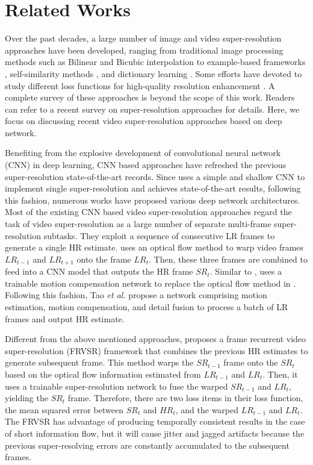 \documentclass[letterpaper]{article} %
\begin{document}
\section{Related Works}

Over the past decades, a large number of image and video super-resolution approaches have been developed, ranging from traditional image processing methods such as Bilinear and Bicubic interpolation to example-based frameworks \cite{Timofte2014Anchored,Jeong2015Multi,Xiong2013Example,Freedman2011TOG}, self-similarity methods \cite{Huang2015Single,Yang2010Exploiting}, and dictionary learning \cite{Perezpellitero2016PSyCo}. Some efforts have devoted to study different loss functions for high-quality resolution enhancement \cite{Sajjadi2017ICCV}. A complete survey of these approaches is beyond the scope of this work. Readers can refer to a recent survey \cite{Walha2016,Agustsson2017cvpr} on super-resolution approaches for details. Here, we focus on discussing recent video super-resolution approaches based on deep network.

Benefiting from the explosive development of convolutional neural network (CNN) in deep learning, CNN based approaches have refreshed the previous super-resolution state-of-the-art records. Since \cite{Dong2014Learning} uses a simple and shallow CNN to implement single super-resolution and achieves state-of-the-art results, following this fashion, numerous works have proposed various deep network architectures. Most of the existing CNN based video super-resolution approaches regard the task of video super-resolution as a large number of separate multi-frame super-resolution subtasks. They exploit a sequence of consecutive LR frames to generate a single HR estimate. \cite{VSRNet2016TCT} uses an optical flow method to warp video frames $LR_{t-1}$ and $LR_{t+1}$ onto the frame $LR_t$. Then, these three frames are combined to feed into a CNN model that outputs the HR frame $SR_t$. Similar to \cite{VSRNet2016TCT}, \cite{VESPCN2017cvpr} uses a trainable motion compensation network to replace the optical flow method in \cite{VSRNet2016TCT}. Following this fashion, Tao \textit{et al.} \cite{Tao2017iccv} propose a network comprising motion estimation, motion compensation, and detail fusion to process a batch of LR frames and output HR estimate.


Different from the above mentioned approaches, \cite{FRVSR2018cvpr} proposes a frame recurrent video super-resolution (FRVSR) framework that combines the previous HR estimates to generate subsequent frame. This method warps the $SR_{t-1}$ frame onto the $SR_t$ based on the optical flow information estimated from $LR_{t-1}$ and $LR_{t}$. Then, it uses a trainable super-resolution network to fuse the warped $SR_{t-1}$ and $LR_{t}$, yielding the $SR_{t}$ frame. Therefore, there are two loss items in their loss function, the mean squared error between $SR_{t}$ and $HR_{t}$, and the warped $LR_{t-1}$ and $LR_{t}$. The FRVSR has advantage of producing temporally consistent results in the case of short information flow, but it will cause jitter and jagged artifacts because the previous super-resolving errors are constantly accumulated to the subsequent frames.
\end{document}
